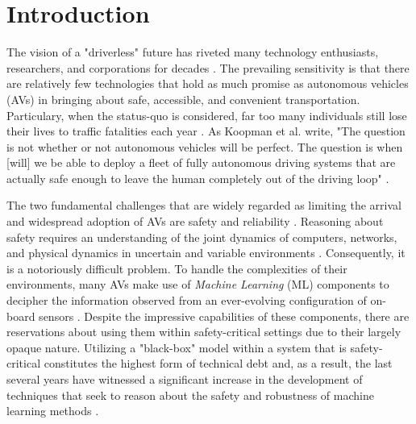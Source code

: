 \documentclass[manuscript,screen,review]{acmart}
\newcommand{\todo}[1]{\textcolor{red}{\textbf{\underline{TODO:}} #1}}
\begin{document}





\maketitle

\section{Introduction}


The vision of a "driverless" future has riveted many technology enthusiasts, researchers, and corporations for decades \cite{Badue2019}. The prevailing sensitivity is that there are relatively few technologies that hold as much promise as autonomous vehicles (AVs) in bringing about safe, accessible, and convenient transportation. Particulary, when the status-quo is considered, far too many individuals still lose their lives to traffic fatalities each year \cite{Rasouli2020}. As Koopman et al. write, "The question is not whether or not autonomous vehicles will be perfect. The question is when [will] we be able to deploy a fleet of fully autonomous driving systems that are actually safe enough to leave the human completely out of the driving loop" \cite{Koopman2017}. 

The two fundamental challenges that are widely regarded as limiting the arrival and widespread adoption of AVs are safety and reliability \cite{Majumdar2017}. Reasoning about safety requires an understanding of the joint dynamics of computers, networks, and physical dynamics in uncertain and variable environments \cite{Yurtsever2019}. Consequently, it is a notoriously difficult problem. To handle the complexities of their environments, many AVs make use of \emph{Machine Learning} (ML) components to decipher the information observed from an ever-evolving configuration of on-board sensors \cite{Yurtsever2019}. Despite the impressive capabilities of these components, there are reservations about using them within safety-critical settings due to their largely opaque nature. Utilizing a "black-box" model within a system that is safety-critical constitutes the highest form of technical debt \cite{Sculley2015} and, as a result, the last several years have witnessed a significant increase in the development of techniques that seek to reason about the safety and robustness of machine learning methods \cite{xiang20118survey}.
\end{document}
